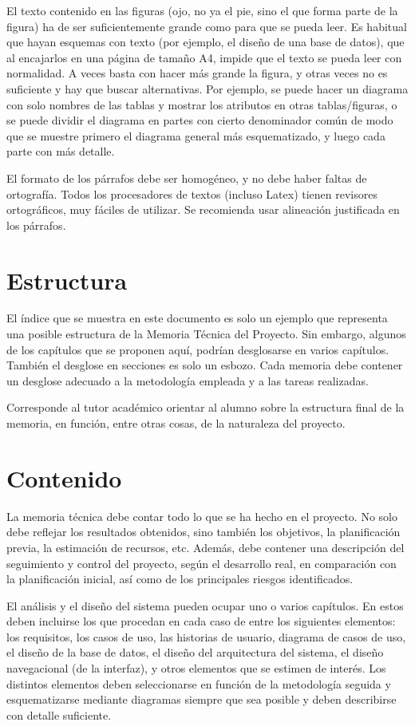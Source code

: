 \documentclass[pdftex,11pt,a4paper]{book}
\begin{document}
El texto contenido en las figuras (ojo, no ya el pie, sino el que forma parte de la figura) ha de ser suficientemente grande como para que se pueda leer. Es habitual que hayan esquemas con texto (por ejemplo, el diseño de una base de datos), que al encajarlos en una página de tamaño A4, impide que el texto se pueda leer con normalidad. 
A veces basta con hacer más grande la figura, y otras veces no es suficiente y hay que buscar alternativas. Por ejemplo, se puede hacer un diagrama con solo nombres de las tablas y mostrar los atributos en otras tablas/figuras, o se puede dividir el diagrama en partes con cierto denominador común de modo que se muestre primero el diagrama general más esquematizado, y luego cada parte con más detalle. 

El formato de los párrafos debe ser homogéneo, y no debe haber faltas de ortografía. Todos los procesadores de textos (incluso Latex) tienen revisores ortográficos, muy fáciles de utilizar.  Se recomienda usar alineación justificada en los párrafos.

\section*{Estructura}

El índice que se muestra en este documento es solo un ejemplo que representa una posible estructura de la Memoria Técnica del Proyecto. Sin embargo, algunos de los capítulos que se proponen aquí, podrían desglosarse en varios capítulos. También el desglose en secciones es solo un esbozo. Cada memoria debe contener un desglose adecuado a la metodología empleada y a las tareas realizadas.

Corresponde al tutor académico orientar al alumno sobre la estructura final de la memoria, en función, entre otras cosas, de la naturaleza del proyecto.

\section*{Contenido}

La memoria técnica debe contar todo lo que se ha hecho en el proyecto. No solo debe reflejar los resultados obtenidos, sino también los objetivos, la planificación previa, la estimación de recursos, etc. Además, debe contener una descripción del seguimiento y control del proyecto, según el desarrollo real, en comparación con la planificación inicial, así como de los principales riesgos identificados.

El análisis y el diseño del sistema pueden ocupar uno o varios capítulos. En estos deben incluirse los que procedan en cada caso de entre los siguientes elementos: los requisitos, los casos de uso, las historias de usuario, diagrama de casos de uso, el diseño de la base de datos, el diseño del arquitectura del sistema, el diseño navegacional (de la interfaz), y otros elementos que se estimen de interés. Los distintos elementos deben seleccionarse en función de la metodología seguida y esquematizarse mediante diagramas siempre que sea posible y deben describirse con detalle suficiente.
\end{document}
